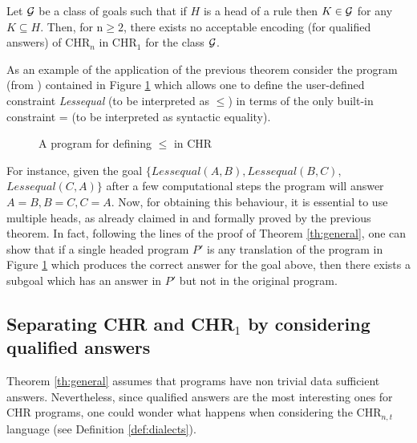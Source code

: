 \begin{corollary}\label{ch:general}
Let ${\cal G}$ be a class of goals such that if  $H$  is a head of a rule then $K \in {\cal G}$ for any $K\subseteq H$. Then, for n$\geq 2$, there exists no acceptable encoding (for qualified answers) of
CHR$_{n}$ in CHR$_1$ for the class ${\cal G}$.
\end{corollary}


As an example of the application of the previous theorem consider the program (from  \cite{Fruhwirth98}) contained
in Figure \ref{tab:lessequal} which allows one to define the user-defined constraint \textit{Lessequal} (to be interpreted as  $\leq$) in terms of the only  built-in constraint = (to be interpreted as syntactic equality).
\begin{figure}[t]
\begin{center}
\end{center}
\caption{A program for defining  $\leq$  in CHR}\label{tab:lessequal}
\end{figure}
For instance, given the goal $\{ Lessequal(A,B), Lessequal(B,C),$ $Lessequal(C,A)\}$
 after a few computational steps the program will answer $A=B, B=C, C=A$.
 Now, for obtaining this behaviour, it is essential to use multiple heads, as already claimed in \cite{Fruhwirth98} and formally proved by the previous theorem.
In fact, following the lines of the proof of Theorem  \ref{th:general}, one can show that
if a single headed program $P'$ is  any translation of the program in Figure \ref{tab:lessequal} which produces the correct answer for the goal above, then there exists a subgoal which has an answer in $P'$ but not in the original program.

\subsection{Separating CHR and CHR$_1$ by considering qualified answers}

Theorem \ref{th:general} assumes that programs have non trivial data sufficient answers. Nevertheless, since qualified answers are the most interesting ones for CHR programs, one could wonder what happens when considering the CHR$_{n,t}$ language (see Definition \ref{def:dialects}).

